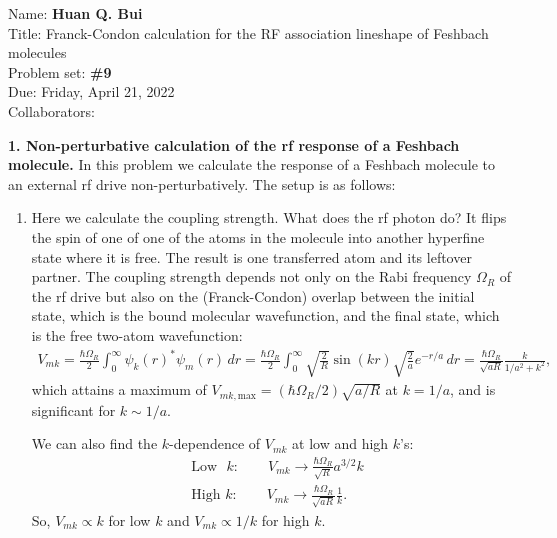 \documentclass{article}
\theoremstyle{definition}
\newcommand{\f}[2]{\frac{#1}{#2}}
\begin{document}
\begin{framed}
\noindent Name: \textbf{Huan Q. Bui}\\
Title: Franck-Condon calculation for the RF association lineshape of Feshbach molecules\\
Problem set: \textbf{\#9}\\
Due: Friday, April 21, 2022\\
Collaborators:  
\end{framed}
	

\noindent \textbf{1. Non-perturbative calculation of the rf response of a Feshbach molecule.} In this problem we calculate the response of a Feshbach molecule to an external rf drive non-perturbatively. The setup is as follows:



\begin{enumerate}[label=(\alph*)]

\item Here we calculate the coupling strength. What does the rf photon do? It flips the spin of one of one of the atoms in the molecule into another hyperfine state where it is free. The result is one transferred atom and its leftover partner. The coupling strength depends not only on the Rabi frequency $\Omega_R$ of the rf drive but also on the (Franck-Condon) overlap between the initial state, which is the bound molecular wavefunction, and the final state, which is the free two-atom wavefunction:
\begin{align*}
V_{mk} = 
\f{\hbar \Omega_R}{2} \int_0^\infty \psi_k(r)^* \psi_m(r)\,dr =  
\f{\hbar \Omega_R}{2} \int_0^\infty \sqrt{\f{2}{R}} \sin(kr) \sqrt{\f{2}{a}} e^{-r/a}\,dr = 
\f{\hbar \Omega_R}{ \sqrt{aR}} \f{k}{1/a^2 + k^2},
\end{align*}
which attains a maximum of $V_{mk,\text{max}} = (\hbar \Omega_R/2)\sqrt{a/R}$ at $k=1/a$, and is significant for $k \sim 1/a$. 

We can also find the $k$-dependence of $V_{mk}$ at low and high $k$'s:
\begin{align*}
&\text{Low } \,\, k: \quad\quad V_{mk} \to \f{\hbar \Omega_R}{\sqrt{R}} a^{3/2} k \\ 
&\text{High } k: \quad\quad V_{mk} \to \f{\hbar \Omega_R}{\sqrt{aR}} \f{1}{k}.
\end{align*}
So, $V_{mk} \propto k$ for low $k$ and $V_{mk} \propto 1/k$ for high $k$.




\end{enumerate}
\end{document}
